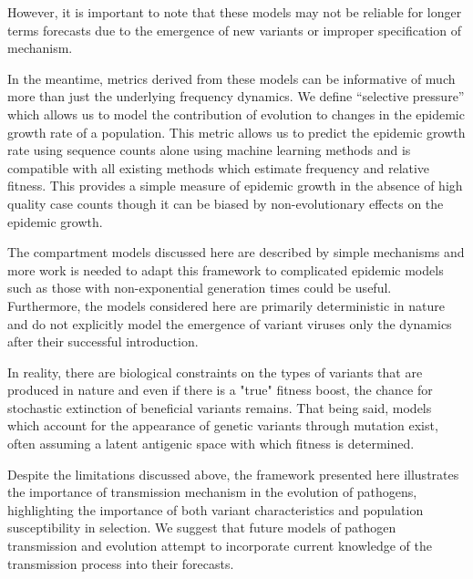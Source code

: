 \documentclass[12pt,oneside,letterpaper]{article}
\begin{document}
However, it is important to note that these models may not be reliable for longer terms forecasts due to the emergence of new variants or improper specification of mechanism.

In the meantime, metrics derived from these models can be informative of much more than just the underlying frequency dynamics.
We define ``selective pressure'' which allows us to model the contribution of evolution to changes in the epidemic growth rate of a population.
This metric allows us to predict the epidemic growth rate using sequence counts alone using machine learning methods and is compatible with all existing methods which estimate frequency and relative fitness.
This provides a simple measure of epidemic growth in the absence of high quality case counts though it can be biased by non-evolutionary effects on the epidemic growth.

%
%


The compartment models discussed here are described by simple mechanisms and more work is needed to adapt this framework to complicated epidemic models such as those with non-exponential generation times could be useful.
Furthermore, the models considered here are primarily deterministic in nature and do not explicitly model the emergence of variant viruses only the dynamics after their successful introduction.

In reality, there are biological constraints on the types of variants that are produced in nature and even if there is a "true" fitness boost, the chance for stochastic extinction of beneficial variants remains.
That being said, models which account for the appearance of genetic variants through mutation exist, often assuming a latent antigenic space with which fitness is determined.

Despite the limitations discussed above, the framework presented here illustrates the importance of transmission mechanism in the evolution of pathogens, highlighting the importance of both variant characteristics and population susceptibility in selection.
We suggest that future models of pathogen transmission and evolution attempt to incorporate current knowledge of the transmission process into their forecasts.
\end{document}
